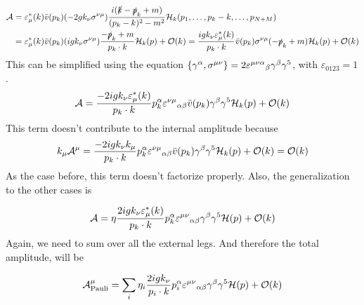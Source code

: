 \documentclass{article}
\newcommand{\s}[1]{\slashed #1}
\begin{document}
\begin{align*}
	\mathcal{A} &
	= \varepsilon^*_\mu(k)\bar{v}(p_k)(-2gk_\nu \sigma^{\nu\mu})\frac{i(\s{k} - \s{p}_k + m)}{(p_k - k)^2 - m^2} \mathcal{H}_k(p_1, \ldots, p_k-k, \ldots, p_{N+M})\\&
	= \varepsilon^*_\mu(k)\bar{v}(p_k)(igk_\nu \sigma^{\nu\mu})\frac{- \s{p}_k + m}{p_k\cdot k} \mathcal{H}_k(p) + \order{k}
	=\frac{igk_\nu\varepsilon^*_\mu(k)}{p_k\cdot k}\bar{v}(p_k)\sigma^{\nu\mu}(-\s{p}_k + m) \mathcal{H}_k(p) + \order{k}
\end{align*}
This can be simplified using the equation $\acomm{\gamma^\alpha}{\sigma^{\mu\nu}}=2\varepsilon^{\mu\nu\alpha}{}_{\beta}\gamma^\beta \gamma^5$, with $\varepsilon_{0123}=1$.
\begin{equation}
\mathcal{A}
=\frac{-2igk_\nu\varepsilon^*_\mu(k)}{p_k\cdot k}p_k^\alpha\varepsilon^{\nu\mu}{}_{\alpha\beta}\bar{v}(p_k)\gamma^\beta \gamma^5 \mathcal{H}_k(p) + \order{k}
\end{equation}
This term doesn't contribute to the internal amplitude because
\begin{equation}
	k_\mu \mathcal{A}^\mu = \frac{-2igk_\nu k_\mu}{p_k\cdot k}p_k^\alpha\varepsilon^{\nu\mu}{}_{\alpha\beta}\bar{v}(p_k)\gamma^\beta \gamma^5 \mathcal{H}_k(p) + \order{k} = \order{k}
\end{equation}
As the case before, this term doesn't factorize properly. Also, the generalization to the other cases is

\begin{equation}
\mathcal{A}
=\eta\frac{2igk_\nu\varepsilon^*_\mu(k)}{p_k\cdot k}p_k^\alpha\varepsilon^{\mu\nu}{}_{\alpha\beta} \gamma^\beta \gamma^5\mathcal{H}(p) + \order{k}
\end{equation}
Again, we need to sum over all the external legs. And therefore the total amplitude, will be

\begin{equation}
	\mathcal{A}^\mu_{\mathrm{Pauli}}
	= \sum_i\eta_i\frac{2igk_\nu}{p_i\cdot k}p_i^\alpha\varepsilon^{\mu\nu}{}_{\alpha\beta} \gamma^\beta \gamma^5\mathcal{H}(p) + \order{k}
\end{equation}
\end{document}
